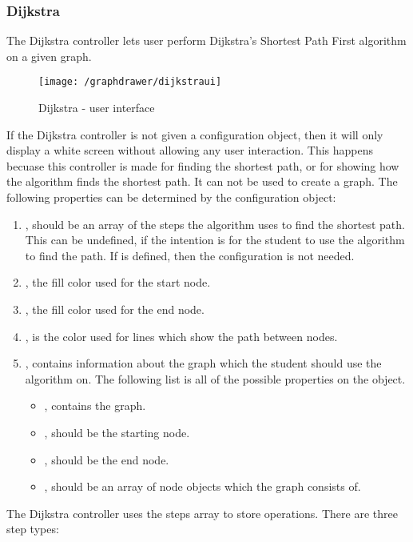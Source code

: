 \subsubsection{Dijkstra}
The Dijkstra controller lets user perform Dijkstra's Shortest Path First algorithm on a given graph.
\begin{figure}[H]
    \centering
    \texttt{[image: /graphdrawer/dijkstraui]}
    \caption{Dijkstra - user interface}
    \label{fig:graphdrawerDijkstraUserInterface}
\end{figure}
If the Dijkstra controller is not given a configuration object, then it will only display a white screen without allowing any user interaction. This happens becuase this controller is made for finding the shortest path, or for showing how the algorithm finds the shortest path. It can not be used to create a graph. The following properties can be determined by the configuration object:
\begin{enumerate}
    \item {}, should be an array of the steps the algorithm uses to find the shortest path. This can be undefined, if the intention is for the student to use the algorithm to find the path. If  is defined, then the  configuration is not needed.
    \item {}, the fill color used for the start node.
    \item {}, the fill color used for the end node.
    \item {}, is the color used for lines which show the path between nodes.
    \item {}, contains information about the graph which the student should use the algorithm on. The following list is all of the possible properties on the  object.
    \begin{itemize}
        \item {}, contains the graph.
        \item {}, should be the starting node.
        \item {}, should be the end node.
        \item {}, should be an array of node objects which the graph consists of.
    \end{itemize}
\end{enumerate}
The Dijkstra controller uses the steps array to store operations. There are three step types:
